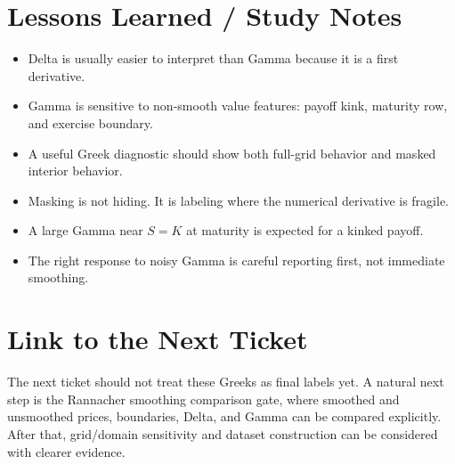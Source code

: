 \documentclass[11pt,a4paper]{article}
\begin{document}
\section{Lessons Learned / Study Notes}

\begin{itemize}
  \item Delta is usually easier to interpret than Gamma because it is a first derivative.
  \item Gamma is sensitive to non-smooth value features: payoff kink, maturity row, and exercise boundary.
  \item A useful Greek diagnostic should show both full-grid behavior and masked interior behavior.
  \item Masking is not hiding. It is labeling where the numerical derivative is fragile.
  \item A large Gamma near \(S=K\) at maturity is expected for a kinked payoff.
  \item The right response to noisy Gamma is careful reporting first, not immediate smoothing.
\end{itemize}

\section{Link to the Next Ticket}

The next ticket should not treat these Greeks as final labels yet. A natural next step is the
Rannacher smoothing comparison gate, where smoothed and unsmoothed prices, boundaries, Delta, and
Gamma can be compared explicitly. After that, grid/domain sensitivity and dataset construction
can be considered with clearer evidence.



\end{document}
